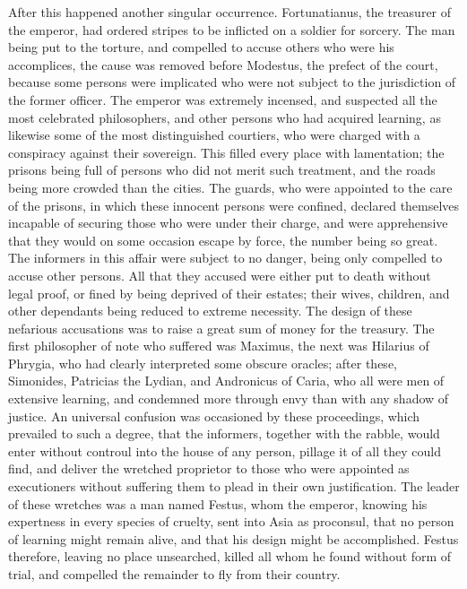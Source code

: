 After this happened another singular occurrence. Fortunatianus, the treasurer of the emperor, had ordered stripes to be inflicted on a soldier for sorcery. The man being put to the torture, and compelled to accuse others who were his accomplices, the cause was removed before Modestus, the prefect of the court, because some persons were implicated who were not subject to the jurisdiction of the former officer. The emperor was extremely incensed, and suspected all the most celebrated philosophers, and other persons who had acquired learning, as likewise some of the most distinguished courtiers, who were charged with a conspiracy against their sovereign. This filled every place with lamentation; the prisons being full of persons who did not merit such treatment, and the roads being more crowded than the cities. The guards, who were appointed to the care of the prisons, in which these innocent persons were confined, declared themselves incapable of securing those who were under their charge, and were apprehensive that they would on some occasion escape by force, the number being so great. The informers in this affair were subject to no danger, being only compelled to accuse other persons. All that they accused were either put to death without legal proof, or fined by being deprived of their estates; their wives, children, and other dependants being reduced to extreme necessity. The design of these nefarious accusations was to raise a great sum of money for the treasury. The first philosopher of note who suffered was Maximus, the next was Hilarius of Phrygia, who had clearly interpreted some obscure oracles; after these, Simonides, Patricias the Lydian, and Andronicus of Caria, who all were men of extensive learning, and condemned more through envy than with any shadow of justice. An universal confusion was occasioned by these proceedings, which prevailed to such a degree, that the informers, together with the rabble, would enter without controul into the house of any person, pillage it of all they could find, and deliver the wretched proprietor to those who were appointed as executioners without suffering them to plead in their own justification. The leader of these wretches was a man named Festus, whom the emperor, knowing his expertness in every species of cruelty, sent into Asia as proconsul, that no person of learning might remain alive, and that his design might be accomplished. Festus therefore, leaving no place unsearched, killed all whom he found without form of trial, and compelled the remainder to fly from their country.

